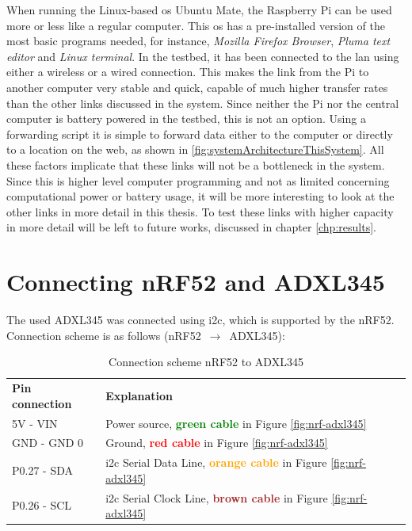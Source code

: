 \noindent When running the Linux-based \gls{os} Ubuntu Mate, the \gls{Raspberry Pi} can be used more or less like a regular computer. This \gls{os} has a pre-installed version of the most basic programs needed, for instance, \textit{Mozilla Firefox Browser}, \textit{Pluma text editor} and \textit{Linux terminal}. In the testbed, it has been connected to the \gls{lan} using either a wireless or a wired connection. This makes the link from the Pi to another computer very stable and quick, capable of much higher transfer rates than the other links discussed in the system. Since neither the Pi nor the central computer is battery powered in the testbed, this is not an option. Using a forwarding script it is simple to forward data either to the computer or directly to a location on the web, as shown in \ref{fig:systemArchitectureThisSystem}. All these factors implicate that these links will not be a bottleneck in the system. Since this is higher level computer programming and not as limited concerning computational power or battery usage, it will be more interesting to look at the other links in more detail in this thesis. To test these links with higher capacity in more detail will be left to future works, discussed in chapter \ref{chp:results}. 

\newpage

\section{Connecting nRF52 and ADXL345}

\noindent The used \gls{ADXL345} was connected using \gls{i2c}, which is supported by the \gls{nRF52}. Connection scheme is as follows (\gls{nRF52} $\,\to\,$ \gls{ADXL345}): 

\begin{table}[H]
\centering
\caption{Connection scheme nRF52 to ADXL345}
\label{nRF52ADXL345connection}
\begin{tabular}{ll}
\textbf{Pin connection} & \textbf{Explanation}                                                                                            \\
5V - VIN               & Power source, \textbf{\textcolor{green}{green cable}} in Figure \ref{fig:nrf-adxl345}                   \\
GND - GND           0   & Ground, \textbf{\textcolor{red}{red cable}} in Figure \ref{fig:nrf-adxl345}                             \\
P0.27 - SDA            & \gls{i2c} Serial Data Line, \textbf{\textcolor{orange}{orange cable}} in Figure \ref{fig:nrf-adxl345} \\
P0.26 - SCL            & \gls{i2c} Serial Clock Line, \textbf{\textcolor{brown}{brown cable}} in Figure \ref{fig:nrf-adxl345} 
\end{tabular}
\end{table}


